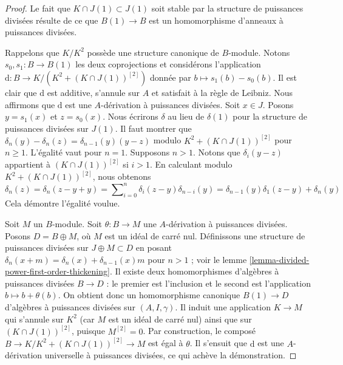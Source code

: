 \begin{proof}
Le fait que $K \cap J(1) \subset J(1)$ soit stable par la structure de
puissances divisées résulte de ce que $B(1) \to B$ est un homomorphisme
d'anneaux à puissances divisées.

\medskip\noindent
Rappelons que $K/K^2$ possède une structure canonique de $B$-module.
Notons $s_0, s_1 : B \to B(1)$ les deux coprojections et considérons
l'application $\text{d} : B \to K/(K^2 +(K \cap J(1))^{[2]})$ donnée par
$b \mapsto s_1(b) - s_0(b)$. Il est clair que $\text{d}$ est additive,
s'annule sur $A$ et satisfait à la règle de Leibniz.
Nous affirmons que $\text{d}$ est une $A$-dérivation à puissances divisées.
Soit $x \in J$. Posons $y = s_1(x)$ et $z = s_0(x)$.
Nous écrirons $\delta$ au lieu de $\delta(1)$ pour
la structure de puissances divisées sur $J(1)$.
Il faut montrer que $\delta_n(y) - \delta_n(z) = \delta_{n - 1}(y)(y - z)$
modulo $K^2 +(K \cap J(1))^{[2]}$ pour $n \geq 1$.
L'égalité vaut pour $n = 1$. Supposons $n > 1$.
Notons que $\delta_i(y - z)$ appartient à $(K \cap J(1))^{[2]}$ si $i > 1$.
En calculant modulo $K^2 + (K \cap J(1))^{[2]}$, nous obtenons
$$
\delta_n(z) = \delta_n(z - y + y) =
\sum\nolimits_{i = 0}^n \delta_i(z - y)\delta_{n - i}(y) =
\delta_{n - 1}(y) \delta_1(z - y) + \delta_n(y)
$$
Cela démontre l'égalité voulue.

\medskip\noindent
Soit $M$ un $B$-module. Soit $\theta : B \to M$ une
$A$-dérivation à puissances divisées.
Posons $D = B \oplus M$, où $M$ est un idéal de carré nul. Définissons une
structure de puissances divisées sur $J \oplus M \subset D$ en posant
$\delta_n(x + m) = \delta_n(x) + \delta_{n - 1}(x)m$ pour $n > 1$ ; voir le
lemme \ref{lemma-divided-power-first-order-thickening}.
Il existe deux homomorphismes d'algèbres à puissances divisées $B \to D$ : le premier
est l'inclusion et le second est l'application $b \mapsto b + \theta(b)$.
On obtient donc un homomorphisme canonique $B(1) \to D$ d'algèbres à
puissances divisées sur $(A, I, \gamma)$. Il induit une application $K \to M$
qui s'annule sur $K^2$ (car $M$ est un idéal de carré nul) ainsi que sur
$(K \cap J(1))^{[2]}$, puisque $M^{[2]} = 0$. Par construction, le composé
$B \to K/K^2 + (K \cap J(1))^{[2]} \to M$ est égal à $\theta$.
Il s'ensuit que $\text{d}$
est une $A$-dérivation universelle à puissances divisées, ce qui achève la démonstration.
\end{proof}

